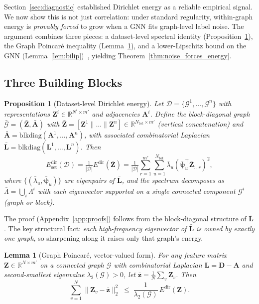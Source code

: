\documentclass{article}
\newtheorem{proposition}{Proposition}
\newtheorem{lemma}{Lemma}
\theoremstyle{definition}
\newcommand{\Edir}{E^{\text{dir}}}
\newcommand{\Edirset}{E^{\text{dir}}_{\text{set}}}
\begin{document}
Section~\ref{sec:diagnostic} established Dirichlet energy as a reliable empirical signal. We now show this is not just correlation: under standard regularity, within-graph energy is \emph{provably forced} to grow when a GNN fits graph-level label noise. The argument combines three pieces: a dataset-level spectral identity (Proposition~\ref{prop:dataset_energy}), the Graph Poincar\'e inequality (Lemma~\ref{lem:poincare}), and a lower-Lipschitz bound on the GNN (Lemma~\ref{lem:bilip})~\citep{chuang2022tree, davidson2024h, juvina2024training}, yielding Theorem~\ref{thm:noise_forces_energy}.

\subsection{Three Building Blocks}

\begin{proposition}[Dataset-level Dirichlet energy]
\label{prop:dataset_energy}
Let $\mathcal{D}=\{\mathcal{G}^1,\dots,\mathcal{G}^n\}$ with representations $\mathbf{Z}^i\in\mathbb{R}^{N^i\times m'}$ and adjacencies $\mathbf{A}^i$. Define the block-diagonal graph $\bar{\mathcal{G}}=(\bar{\mathbf{Z}},\bar{\mathbf{A}})$ with $\bar{\mathbf{Z}}=[\mathbf{Z}^1\|\dots\|\mathbf{Z}^n]\in\mathbb{R}^{N_{\text{tot}}\times m'}$ (vertical concatenation) and $\bar{\mathbf{A}}=\mathrm{blkdiag}(\mathbf{A}^1,\dots,\mathbf{A}^n)$, with associated combinatorial Laplacian $\bar{\mathbf{L}}=\mathrm{blkdiag}(\mathbf{L}^1,\dots,\mathbf{L}^n)$. Then
\begin{equation}
\Edirset(\mathcal{D})=\tfrac{1}{|\mathcal{D}|}\Edir(\bar{\mathbf{Z}})=\tfrac{1}{|\mathcal{D}|}\!\!\sum_{r=1}^{m'}\sum_{u=1}^{N_{\text{tot}}}\bar{\lambda}_u(\bar{\bm{\psi}}_u^\top\bar{\mathbf{Z}}_{:,r})^2,
\label{eq:spectral_dataset}
\end{equation}
where $\{(\bar{\lambda}_u,\bar{\bm{\psi}}_u)\}$ are eigenpairs of $\bar{\mathbf{L}}$, and the spectrum decomposes as $\bar{\Lambda}=\bigcup_i\Lambda^i$ with each eigenvector supported on a single connected component $\mathcal{G}^i$ (graph or block).
\end{proposition}

The proof (Appendix~\ref{app:proofs}) follows from the block-diagonal structure of $\bar{\mathbf{L}}$. The key structural fact: \emph{each high-frequency eigenvector of $\bar{\mathbf{L}}$ is owned by exactly one graph}, so sharpening along it raises only that graph's energy.

\begin{lemma}[Graph Poincar\'e, vector-valued form]
\label{lem:poincare}
For any feature matrix $\mathbf{Z}\in\mathbb{R}^{N\times m'}$ on a connected graph $\mathcal{G}$ with combinatorial Laplacian $\mathbf{L}=\mathbf{D}-\mathbf{A}$ and second-smallest eigenvalue $\lambda_2(\mathcal{G})>0$, let $\bar{\mathbf{z}}=\frac{1}{N}\sum_v\mathbf{Z}_v$. Then
\begin{equation}
\sum_{v=1}^N\|\mathbf{Z}_v-\bar{\mathbf{z}}\|_2^2\;\le\;\frac{1}{\lambda_2(\mathcal{G})}\,\Edir(\mathbf{Z}).
\label{eq:poincare}
\end{equation}
\end{lemma}
\end{document}
